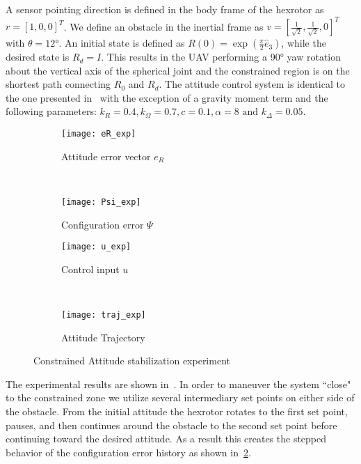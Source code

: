 \documentclass[letterpaper, 10 pt, conference]{ieeeconf}  %
\begin{document}
A sensor pointing direction is defined in the body frame of the hexrotor as \( r = [1,0,0]^T \).
We define an obstacle in the inertial frame as \( v = [\frac{1}{\sqrt{2}}, \frac{1}{\sqrt{2}}, 0]^T \) with \( \theta = \ang{12} \).
An initial state is defined as \(R(0) = \exp( \frac{\pi}{2} \hat{e}_3) \), while the desired state is \(R_d =I \).
This results in the UAV performing a \ang{90} yaw rotation about the vertical axis of the spherical joint and the constrained region is on the shortest path connecting $R_0$ and $R_d$. 
The attitude control system is identical to the one presented in~ with the exception of a gravity moment term and the following parameters: \(k_R = 0.4, k_\Omega = 0.7 ,c = 0.1 , \alpha = 8 \text{ and } k_\Delta = 0.05\).
\begin{figure} 
	\centering 
	\begin{subfigure}[htbp]{0.5\columnwidth} 
		\texttt{[image: eR\_exp]} 
		\caption{Attitude error vector \(e_R\) } \label{fig:eR_exp} 
	\end{subfigure}~ %
	\begin{subfigure}[htbp]{0.5\columnwidth} 
		\texttt{[image: Psi\_exp]} 
		\caption{Configuration error \( \Psi \)} \label{fig:Psi_exp} 
	\end{subfigure}
	
	\begin{subfigure}[htbp]{0.5\columnwidth} 
		\texttt{[image: u\_exp]} 
		\caption{Control input \( u\)} \label{fig:u_exp} 
	\end{subfigure}~
	\begin{subfigure}[htbp]{0.5\columnwidth} 
		\texttt{[image: traj\_exp]} 
		\caption{Attitude Trajectory} \label{fig:traj_exp} 
	\end{subfigure}
	\caption{Constrained Attitude stabilization experiment}
	\label{fig:exp} 
\end{figure}

The experimental results are shown in~.
In order to maneuver the system ``close" to the constrained zone we utilize several intermediary set points on either side of the obstacle.
From the initial attitude the hexrotor rotates to the first set point, pauses, and then continues around the obstacle to the second set point before continuing toward the desired attitude.
As a result this creates the stepped behavior of the configuration error history as shown in~\cref{fig:Psi_exp}.
\end{document}
